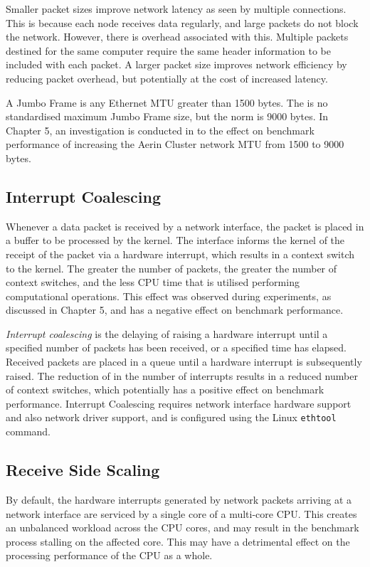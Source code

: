 Smaller packet sizes improve network latency as seen by multiple connections. This is because each node receives data regularly, and large packets do not block the network. However, there is overhead associated with this. Multiple packets destined for the same computer require the same header information to be included with each packet. A larger packet size improves network efficiency by reducing packet overhead, but potentially at the cost of increased latency.

A Jumbo Frame is any Ethernet MTU greater than 1500 bytes. The is no standardised maximum Jumbo Frame size, but the norm is 9000 bytes. In Chapter 5, an investigation is conducted in to the effect on benchmark performance of increasing the Aerin Cluster network MTU from 1500 to 9000 bytes.


\subsection{Interrupt Coalescing}

Whenever a data packet is received by a network interface, the packet is placed in a buffer to be processed by the kernel. The interface informs the kernel of the receipt of the packet via a hardware interrupt, which results in a context switch to the kernel. The greater the number of packets, the greater the number of context switches, and the less CPU time that is utilised performing computational operations. This effect was observed during experiments, as discussed in Chapter 5, and has a negative effect on benchmark performance.

\emph{Interrupt coalescing} is the delaying of raising a hardware interrupt until a specified number of packets has been received, or a specified time has elapsed. Received packets are placed in a queue until a hardware interrupt is subsequently raised. The reduction of in the number of interrupts results in a reduced number of context switches, which potentially has a positive effect on benchmark performance. Interrupt Coalescing requires network interface hardware support and also network driver support, and is configured using the Linux \verb|ethtool| command.


\subsection{Receive Side Scaling}

By default, the hardware interrupts generated by network packets arriving at a network interface are serviced by a single core of a multi-core CPU. This creates an unbalanced workload across the CPU cores, and may result in the benchmark process stalling on the affected core. This may have a detrimental effect on the processing performance of the CPU as a whole.

